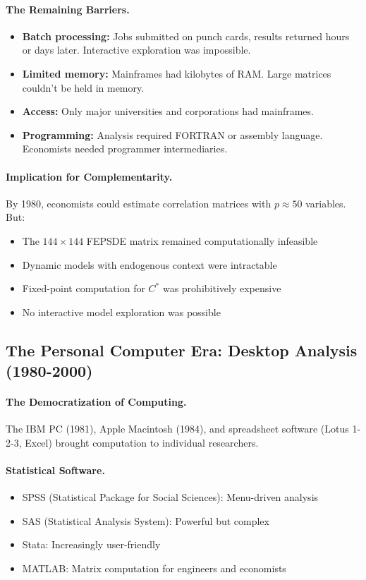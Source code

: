 \documentclass[12pt,a4paper]{article}
\begin{document}
\paragraph{The Remaining Barriers.}
\begin{itemize}
  \item \textbf{Batch processing:} Jobs submitted on punch cards, results returned hours or days later.
        Interactive exploration was impossible.
  \item \textbf{Limited memory:} Mainframes had kilobytes of RAM.
        Large matrices couldn't be held in memory.
  \item \textbf{Access:} Only major universities and corporations had mainframes.
  \item \textbf{Programming:} Analysis required FORTRAN or assembly language.
        Economists needed programmer intermediaries.
\end{itemize}

\paragraph{Implication for Complementarity.}
By 1980, economists could estimate correlation matrices with $p \approx 50$ variables.
But:
\begin{itemize}
  \item The $144 \times 144$ FEPSDE matrix remained computationally infeasible
  \item Dynamic models with endogenous context were intractable
  \item Fixed-point computation for $C^*$ was prohibitively expensive
  \item No interactive model exploration was possible
\end{itemize}

\subsection{The Personal Computer Era: Desktop Analysis (1980-2000)}

\paragraph{The Democratization of Computing.}
The IBM PC (1981), Apple Macintosh (1984), and spreadsheet software (Lotus 1-2-3, Excel)
brought computation to individual researchers.

\paragraph{Statistical Software.}
\begin{itemize}
  \item SPSS (Statistical Package for Social Sciences): Menu-driven analysis
  \item SAS (Statistical Analysis System): Powerful but complex
  \item Stata: Increasingly user-friendly
  \item MATLAB: Matrix computation for engineers and economists
\end{itemize}
\end{document}
